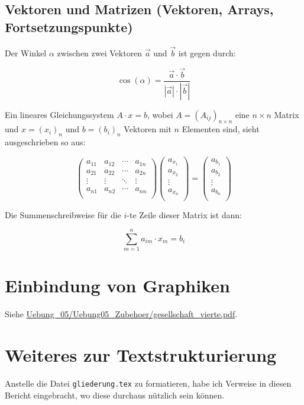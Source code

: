 \documentclass[12pt]{report}
\begin{document}
\subsection{Vektoren und Matrizen (Vektoren, Arrays, Fortsetzungspunkte)}

Der Winkel $\alpha$ zwischen zwei Vektoren $\vec{a}$ und $\vec{b}$ ist gegen durch:

\[ \cos(\alpha) = \frac{\vec{a} \cdot \vec{b}}{|\vec{a}| \cdot |\vec{b}|} \]

Ein lineares Gleichungssystem $A \cdot x = b$, wobei $A = (A_{ij})_{n \times n}$ eine $n \times n$ Matrix und $x=(x_i)_n$ und $b=(b_i)_n$ Vektoren mit $n$ Elementen sind, sieht ausgeschrieben so aus:

\[
\left(
\begin{matrix}
a_{11} & a_{12} & \cdots & a_{1n} \\
a_{21} & a_{22} & \cdots & a_{2n} \\
\vdots & \vdots & \ddots & \vdots \\
a_{n1} & a_{n2} & \cdots & a_{nn} \\
\end{matrix}
\right)
\left(
\begin{matrix}
a_{x_1}  \\
a_{x_2}  \\
\vdots \\
a_{x_n}  \\
\end{matrix}
\right)
=
\left(
\begin{matrix}
a_{b_1}  \\
a_{b_2}  \\
\vdots \\
a_{b_n}  \\
\end{matrix}
\right)
\]

Die Summenschreibweise für die $i$-te Zeile dieser Matrix ist dann:

\[ \sum_{m=1}^n a_{im} \cdot x_m = b_i \]

\section{Einbindung von Graphiken}
Siehe \url{Uebung_05/Uebung05_Zubehoer/gesellschaft_vierte.pdf}.

\section{Weiteres zur Textstrukturierung}
Anstelle die Datei \texttt{gliederung.tex} zu formatieren, habe ich Verweise in diesen Bericht eingebracht, wo diese durchaus nützlich sein können.
\end{document}
